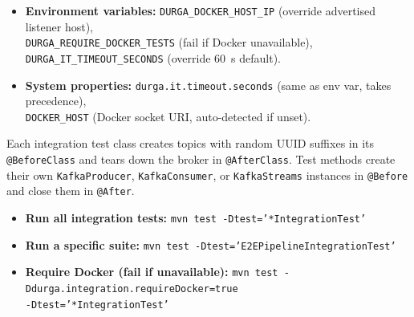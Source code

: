 \begin{itemize}
\item \textbf{Environment variables:}
\texttt{DURGA\_DOCKER\_HOST\_IP} (override advertised listener host), \\
\texttt{DURGA\_REQUIRE\_DOCKER\_TESTS} (fail if Docker unavailable),
\texttt{DURGA\_IT\_TIMEOUT\_SECONDS} (override 60~s default).
\item \textbf{System properties:}
\texttt{durga.it.timeout.seconds} (same as env var, takes precedence), \\
\texttt{DOCKER\_HOST} (Docker socket URI, auto-detected if unset).
\end{itemize}

Each integration test class creates topics with random UUID suffixes in
its \texttt{@BeforeClass} and tears down the broker in \texttt{@AfterClass}.
Test methods create their own \texttt{KafkaProducer}, \texttt{KafkaConsumer},
or \texttt{KafkaStreams} instances in \texttt{@Before} and close them in
\texttt{@After}.

\begin{itemize}
\item \textbf{Run all integration tests:}
\texttt{mvn test -Dtest='*IntegrationTest'}

\item \textbf{Run a specific suite:}
\texttt{mvn test -Dtest='E2EPipelineIntegrationTest'}

\item \textbf{Require Docker (fail if unavailable):}
\texttt{mvn test -Ddurga.integration.requireDocker=true \\-Dtest='*IntegrationTest' }
\end{itemize}
